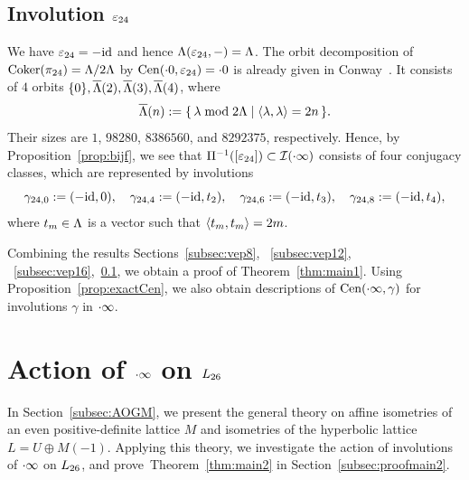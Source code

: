 \documentclass{amsart} %
\begin{document}
\subsection{Involution $\varepsilon_{24}$}\label{subsec:vep24}
%
We have $\varepsilon_{24}=-\mathord{\mathrm{id}}$ and hence $\Lambda(\varepsilon_{24}, -)=\Lambda$.
The orbit decomposition of 
$\operatorname{Coker}(\pi_{24})=\Lambda/2\Lambda$ by $\mathrm{Cen}(\cdot 0, \varepsilon_{24})=\cdot 0$ is already given in 
Conway~\cite[Chapter 10, Section 3.3]{theCSbook}.
It consists of $4$ orbits $\{0\}, \overline{\Lambda}(2), \overline{\Lambda}(3), \overline{\Lambda}(4)$, where 
\[
 \overline{\Lambda}(n):=\{\,{\lambda\bmod 2\Lambda}\mid {\langle \lambda, \lambda \rangle=2n} \,\}.
\]
Their sizes are $1$, $98280$, $8386560$, and $8292375$, respectively.
Hence, by Proposition~\ref{prop:bijf}, we see that 
$\Pi^{-1} ([\varepsilon_{24}])\subset \mathord{\mathcal{I}}(\cdot \infty)$ consists of four conjugacy classes,
 which are 
 represented by involutions
 \[
\gamma_{24, 0}:=(-\mathord{\mathrm{id}}, 0),
\quad
\gamma_{24, 4}:=(-\mathord{\mathrm{id}}, t_2),
\quad
\gamma_{24, 6}:=(-\mathord{\mathrm{id}}, t_3),
\quad
\gamma_{24, 8}:=(-\mathord{\mathrm{id}}, t_4),
 \]
where $t_m\in \Lambda$ is a vector such that
$\langle  t_m, t_m \rangle=2m$.
%
\par
\medskip
Combining the results Sections~\ref{subsec:vep8}, ~\ref{subsec:vep12}, ~\ref{subsec:vep16},~\ref{subsec:vep24},
we obtain a proof of Theorem~\ref{thm:main1}.
Using Proposition~\ref{prop:exactCen}, we also obtain descriptions of $\mathrm{Cen}(\cdot \infty, \gamma)$
for involutions $\gamma$ in $\cdot \infty$.
%
%
\section{Action of $\cdot \infty$ on $L_{26}$}\label{sec:proofThm2}
%
In Section~\ref{subsec:AOGM}, 
we present the general theory on affine isometries of an even positive-definite lattice $M$
and isometries of the hyperbolic lattice $L=U\oplus M(-1)$.
Applying this theory,
we investigate the action of involutions of $\cdot \infty$ on $L_{26}$,
and prove~Theorem~\ref{thm:main2} in Section~\ref{subsec:proofmain2}.
%
%
\end{document}
